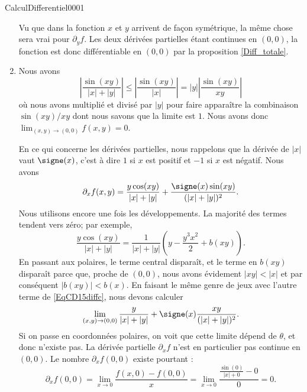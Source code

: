 \begin{corrige}{CalculDifferentiel0001}
\begin{enumerate}
			Vu que dans la fonction $x$ et $y$ arrivent de façon symétrique, la même chose sera vrai pour $\partial_yf$. Les deux dérivées partielles étant continues en $(0,0)$, la fonction est donc différentiable en $(0,0)$ par la proposition \ref{Diff_totale}.


		\item
			Nous avons
			\begin{equation}
				\left| \frac{ \sin(xy) }{ | x |+| y | } \right| \leq\left| \frac{ \sin(xy) }{ | x | } \right| =| y |\left| \frac{ \sin(xy) }{ xy } \right| 
			\end{equation}
			où nous avons multiplié et divisé par $| y |$ pour faire apparaître la combinaison $\sin(xy)/xy$ dont nous savons que la limite est $1$. Nous avons donc $\lim_{(x,y)\to(0,0)}f(x,y)=0$.

			En ce qui concerne les dérivées partielles, nous rappelons que la dérivée de $| x |$ vaut $\signe(x)$, c'est à dire $1$ si $x$ est positif et $-1$ si $x$ est négatif. Nous avons
			\begin{equation}		\label{EqCD15diffc}
				\partial_xf(x,y)=\frac{ y\cos(xy) }{ | x |+| y | }+\frac{ \signe(x)\sin(xy) }{ (| x |+| y |)^2 }.
			\end{equation}
			Nous utilisons encore une fois les développements. La majorité des termes tendent vers zéro; par exemple,
			\begin{equation}
				\frac{ y\cos(xy) }{ | x |+| y | }=\frac{1}{ | x |+| y | }\left( y-\frac{ y^3x^2 }{2}+b(xy) \right).
			\end{equation}
			En passant aux polaires, le terme central disparaît, et le terme en $b(xy)$ disparaît parce que, proche de $(0,0)$, nous avons évidement $|xy|<|x|$ et par conséquent $| b(xy) |<b(x)$. En faisant le même genre de jeux avec l'autre terme de \eqref{EqCD15diffc}, nous devons calculer
			\begin{equation}
				\lim_{(x,y)\to(0,0)}\frac{ y }{ | x |+| y | }+\signe(x)\frac{ xy }{ (| x |+| y |)^2 }.
			\end{equation}
			Si on passe en coordonnées polaires, on voit que cette limite dépend de $\theta$, et donc n'existe pas. La dérivée partielle $\partial_xf$ n'est en particulier pas continue en $(0,0)$. Le nombre $\partial_xf(0,0)$ existe pourtant :
			\begin{equation}
				\partial_xf(0,0)=\lim_{x\to 0} \frac{ f(x,0)-f(0,0) }{ x }=\lim_{x\to 0} \frac{ \frac{ \sin(0) }{ | x |+0 }-0 }{ 0 }=0.
			\end{equation}
			


\end{enumerate}
\end{corrige}
